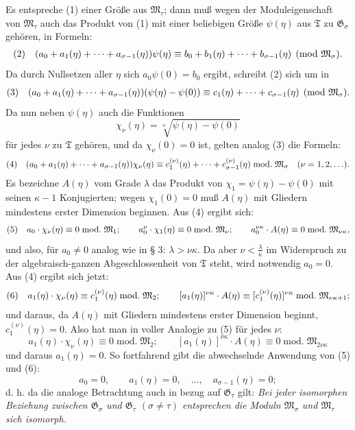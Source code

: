 Es entspreche (1) einer Größe aus $\mathfrak M_\tau$; dann muß wegen der
Moduleigenschaft von $\mathfrak M_\tau$ auch das Produkt von (1) mit einer
beliebigen Größe $\psi(\eta)$ aus $\mathfrak T$ zu $\mathfrak G_\sigma$
gehören, in Formeln:
\[
\begin{array}{@{}l@{\quad}l@{}}
(2)& \displaystyle (a_0+a_1(\eta)+\cdots+a_{\sigma-1}(\eta))\psi(\eta)
\equiv b_0+b_1(\eta)+\cdots+b_{\sigma-1}(\eta)
\pmod{\mathfrak M_\sigma}.
\end{array}
\]
Da durch Nullsetzen aller $\eta$ sich $a_0\psi(0)=b_0$ ergibt, schreibt (2) sich
um in
\[
\begin{array}{@{}l@{\quad}l@{}}
(3)& \displaystyle (a_0+a_1(\eta)+\cdots+a_{\sigma-1}(\eta))(\psi(\eta)-\psi(0))
\equiv c_1(\eta)+\cdots+c_{\sigma-1}(\eta)
\pmod{\mathfrak M_\sigma}.
\end{array}
\]
Da nun neben $\psi(\eta)$ auch die Funktionen
\[
 \chi_\nu(\eta)=\sqrt[\nu]{\psi(\eta)-\psi(0)}
\]
für jedes $\nu$ zu $\mathfrak T$ gehören, und da $\chi_\nu(0)=0$ ist, gelten
analog (3) die Formeln:
\[
\begin{array}{@{}l@{\quad}l@{}}
(4)& \displaystyle (a_0+a_1(\eta)+\cdots+a_{\sigma-1}(\eta))\chi_\nu(\eta)
\equiv c_1^{(\nu)}(\eta)+\cdots+c_{\sigma-1}^{(\nu)}(\eta)
\;\mathrm{mod.}\;\mathfrak M_\sigma
\quad(\nu=1,2,\ldots).
\end{array}
\]
Es bezeichne $A(\eta)$ vom Grade $\lambda$ das Produkt von
$\chi_1=\psi(\eta)-\psi(0)$ mit seinen $\kappa-1$ Konjugierten; wegen
$\chi_1(0)=0$ muß $A(\eta)$ mit Gliedern mindestens erster Dimension beginnen.
Aus (4) ergibt sich:
\[
\begin{array}{@{}l@{\quad}l@{}}
(5)& \displaystyle a_0\cdot\chi_\nu(\eta)\equiv0\;\mathrm{mod.}\;\mathfrak M_1;\qquad
a_0^\nu\cdot\chi_1(\eta)\equiv0\;\mathrm{mod.}\;\mathfrak M_\nu;\qquad
a_0^{\nu\kappa}\cdot A(\eta)\equiv0\;\mathrm{mod.}\;\mathfrak M_{\nu\kappa},
\end{array}
\]
und also, für $a_0\ne0$ analog wie in § 3: $\lambda>\nu\kappa$. Da aber
$\nu<\frac{\lambda}{\kappa}$ im Widerspruch zu der algebraisch-ganzen
Abgeschlossenheit von $\mathfrak T$ steht, wird notwendig $a_0=0$. Aus (4)
ergibt sich jetzt:
\[
\begin{array}{@{}l@{\quad}l@{}}
(6)& \displaystyle a_1(\eta)\cdot\chi_\nu(\eta)\equiv c_1^{(\nu)}(\eta)\;\mathrm{mod.}\;\mathfrak M_2;\qquad
[a_1(\eta)]^{\nu\kappa}\cdot A(\eta)
\equiv[c_1^{(\nu)}(\eta)]^{\nu\kappa}\;\mathrm{mod.}\;\mathfrak M_{\nu\kappa+1};
\end{array}
\]
und daraus, da $A(\eta)$ mit Gliedern mindestens erster Dimension beginnt,
$c_1^{(\nu)}(\eta)=0$. Also hat man in voller Analogie zu (5) für jedes $\nu$:
\[
 a_1(\eta)\cdot\chi_\nu(\eta)\equiv0\;\mathrm{mod.}\;\mathfrak M_2;\qquad
 [a_1(\eta)]^{\nu\kappa}\cdot A(\eta)\equiv0\;\mathrm{mod.}\;\mathfrak M_{2\nu\kappa}
\]
und daraus $a_1(\eta)=0$. So fortfahrend gibt die abwechselnde Anwendung von
(5) und (6):
\[
 a_0=0,\qquad a_1(\eta)=0,\quad \ldots,\quad a_{\sigma-1}(\eta)=0;
\]
d. h. da die analoge Betrachtung auch in bezug auf $\mathfrak G_\tau$ gilt:
\emph{Bei jeder isomorphen Beziehung zwischen $\mathfrak G_\sigma$ und
$\mathfrak G_\tau$ $(\sigma\ne\tau)$ entsprechen die Moduln $\mathfrak M_\sigma$
und $\mathfrak M_\tau$ sich isomorph.}

